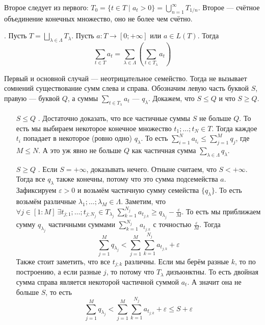 \documentclass{article}
\begin{document}
\begin{itemize}
\begin{Proof}
            Второе следует из первого: $T_0=\{t\in T\mid a_t>0\}=\bigcup\limits_{n=1}^\infty T_{1/n}$. Второе --- счётное объединение конечных множество, оно не более чем счётно.
        \end{Proof}
        \thm {}. Пусть $T=\bigsqcup\limits_{\lambda\in\Lambda}T_\lambda$. Пусть $a\colon T\to[0;+\infty]$ или $a\in L(T)$. Тогда
        $$
        \sum\limits_{t\in T}a_t=\sum\limits_{\lambda\in\Lambda}\left(\sum\limits_{t\in T_\lambda}a_t\right)
        $$
        \begin{Proof}
            Первый и основной случай --- неотрицательное семейство. Тогда не вызывает сомнений существование сумм слева и справа. Обозначим левую часть буквой $S$, правую --- буквой $Q$, а суммы $\sum\limits_{t\in T_\lambda}a_t$ --- $q_\lambda$. Докажем, что $S\leqslant Q$ и что $S\geqslant Q$.
            \begin{itemize}
                \item[$S\leqslant Q$]. Достаточно доказать, что все частичные суммы $S$ не больше $Q$. То есть мы выбираем некоторое конечное множество $t_1;\ldots;t_N\in T$. Тогда каждое $t_i$ попадает в некоторое (ровно одно) $q_\lambda$. То есть $\sum\limits_{i=1}^N a_{t_i}\leqslant\sum\limits_{j=1}^Mq_j$, где $M\leqslant N$. А это уж явно не больше $Q$ как частичная сумма $\sum\limits_{\lambda\in\Lambda}q_\lambda$.
                \item[$S\geqslant Q$]. Если $S=+\infty$, доказывать нечего. Отныне считаем, что $S<+\infty$. Тогда все $q_\lambda$ также конечны, потому что это сумма подсемейства $a$. Зафиксируем $\varepsilon>0$ и возьмём частичную сумму семейства $\{q_\lambda\}$. То есть возьмём различные $\lambda_1;\ldots;\lambda_M\in\Lambda$. Заметим, что $\forall j\in[1:M]~\exists t_{j;1};\ldots;t_{j;N_j}\in T_{\lambda_j}~\sum\limits_{k=1}^{N_j}a_{t_{j;k}}\geqslant q_{\lambda_j}-\frac\varepsilon M$. То есть мы приближаем сумму $q_{\lambda_j}$ частичными суммами $\sum\limits_{k=1}^{N_j}a_{t_{j;k}}$ с точностью $\frac\varepsilon M$. Тогда
                $$
                \sum\limits_{j=1}^Mq_{\lambda_j}<\sum\limits_{j=1}^M\sum\limits_{k=1}^{N_j}a_{t_{j;k}}+\varepsilon
                $$
                Также стоит заметить, что все $t_{j;k}$ различны. Если мы берём разные $k$, то по построению, а если разные $j$, то потому что $T_\lambda$ дизъюнктны. То есть двойная сумма справа является некоторой частичной суммой $a_t$. А значит она не больше $S$, то есть
                $$
                \sum\limits_{j=1}^Mq_{\lambda_j}<\sum\limits_{j=1}^M\sum\limits_{k=1}^{N_j}a_{t_{j;k}}+\varepsilon\leqslant S+\varepsilon
$$
\end{itemize}
\end{Proof}
\end{itemize}
\end{document}
